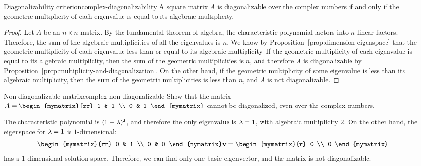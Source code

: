 \begin{proposition}{Diagonalizability criterion}{complex-diagonalizability}
  A square matrix $A$ is diagonalizable over the complex numbers if
  and only if the geometric multiplicity of each eigenvalue is equal
  to its algebraic multiplicity.
\end{proposition}

\begin{proof}
  Let $A$ be an $n\times n$-matrix. By the fundamental theorem of
  algebra, the characteristic polynomial factors into $n$ linear
  factors. Therefore, the sum of the algebraic multiplicities of all
  the eigenvalues is $n$. We know by
  Proposition~\ref{prop:dimension-eigenspace} that the geometric
  multiplicity of each eigenvalue less than or equal to its algebraic
  multiplicity. If the geometric multiplicity of each eigenvalue is
  equal to its algebraic multiplicity, then the sum of the geometric
  multiplicities is $n$, and therefore $A$ is diagonalizable by
  Proposition~\ref{prop:multiplicity-and-diagonalization}. On the
  other hand, if the geometric multiplicity of some eigenvalue is less
  than its algebraic multiplicity, then the sum of the geometric
  multiplicities is less than $n$, and $A$ is not diagonalizable.
\end{proof}

\begin{example}{Non-diagonalizable matrix}{complex-non-diagonalizable}
  Show that the matrix $A =
    \begin{mymatrix}{rr}
      1 & 1 \\
      0 & 1
    \end{mymatrix}$ cannot be diagonalized, even over the complex numbers.
\end{example}

\begin{solution}
  The characteristic polynomial is $(1-\lambda)^2$, and therefore
  the only eigenvalue is $\lambda=1$, with algebraic multiplicity
  $2$. On the other hand, the eigenspace for $\lambda=1$ is
  $1$-dimensional:
  \begin{equation*}
    \begin{mymatrix}{rr}
      0 & 1 \\
      0 & 0
    \end{mymatrix}
    \vect{v}
    = \begin{mymatrix}{r} 0 \\ 0 \end{mymatrix}
  \end{equation*}
  has a $1$-dimensional solution space. Therefore, we can find only one
  basic eigenvector, and the matrix is not diagonalizable.
\end{solution}

